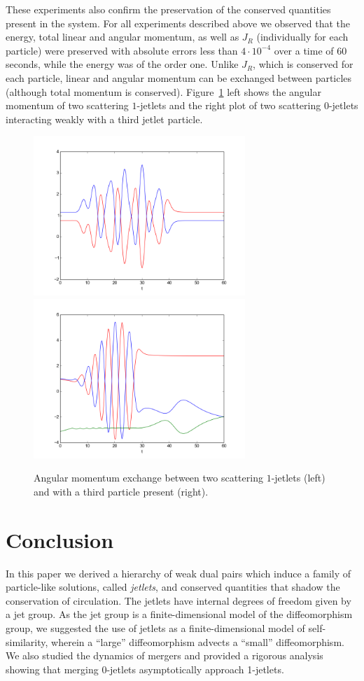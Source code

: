 \documentclass[12pt]{amsart}
\begin{document}
These experiments also confirm the preservation of the conserved
quantities present in the system. For all experiments described above
we observed that the energy, total linear and angular momentum,
as well as $J_R$ (individually for each particle) were
preserved with absolute errors less than $4 \cdot 10^{-4}$ over a time
of $60$ seconds, while the energy was of the order one. Unlike $J_R$,
which is conserved for each particle, linear and angular momentum can be
exchanged between particles (although total momentum is conserved).
Figure~\ref{fig:angmom-exchange} left shows
the angular momentum of two scattering $1$-jetlets and
the right plot of two scattering $0$-jetlets
interacting weakly with a third jetlet particle.

\begin{figure}[htb]
  \centering
  \includegraphics[width=8cm]{angmom-1jetlets}
  \includegraphics[width=8cm]{angmom-3rd-jetlet}
  \caption{Angular momentum exchange between two scattering
    $1$-jetlets (left) and with a third particle present (right).}
  \label{fig:angmom-exchange}
\end{figure}

\section{Conclusion}
  In this paper we derived a hierarchy of weak dual pairs
  which induce a family of particle-like solutions, called \emph{jetlets}, and conserved quantities
  that shadow the conservation of circulation.
  The jetlets have internal degrees of freedom given by a jet group.
  As the jet group is a finite-dimensional model of the diffeomorphism
  group, we suggested the use of jetlets as a finite-dimensional model
  of self-similarity, wherein a ``large'' diffeomorphism advects a ``small''
  diffeomorphism.
  We also studied the dynamics of mergers and provided a rigorous analysis showing that merging
  0-jetlets asymptotically approach 1-jetlets.
\end{document}
